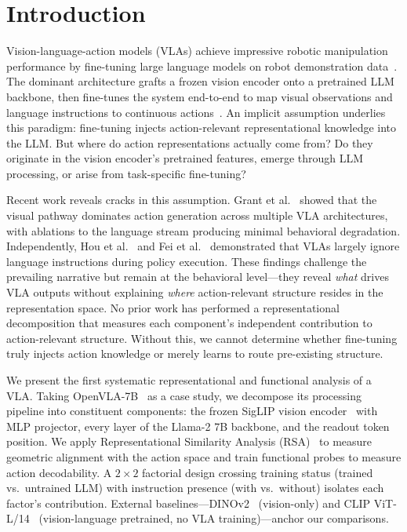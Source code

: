 \section{Introduction}
\label{sec:introduction}

Vision-language-action models (VLAs) achieve impressive robotic manipulation performance by fine-tuning large language models on robot demonstration data~\cite{brohan2023_rt2,kim2024_openvla}.
The dominant architecture grafts a frozen vision encoder onto a pretrained LLM backbone, then fine-tunes the system end-to-end to map visual observations and language instructions to continuous actions~\cite{karamcheti2024}.
An implicit assumption underlies this paradigm: fine-tuning injects action-relevant representational knowledge into the LLM.
But where do action representations actually come from?
Do they originate in the vision encoder's pretrained features, emerge through LLM processing, or arise from task-specific fine-tuning?

Recent work reveals cracks in this assumption.
Grant et al.~\cite{grant2026} showed that the visual pathway dominates action generation across multiple VLA architectures, with ablations to the language stream producing minimal behavioral degradation.
Independently, Hou et al.~\cite{hou2026} and Fei et al.~\cite{fei2025} demonstrated that VLAs largely ignore language instructions during policy execution.
These findings challenge the prevailing narrative but remain at the behavioral level---they reveal \emph{what} drives VLA outputs without explaining \emph{where} action-relevant structure resides in the representation space.
No prior work has performed a representational decomposition that measures each component's independent contribution to action-relevant structure.
Without this, we cannot determine whether fine-tuning truly injects action knowledge or merely learns to route pre-existing structure.

We present the first systematic representational and functional analysis of a VLA.
Taking OpenVLA-7B~\cite{kim2024_openvla} as a case study, we decompose its processing pipeline into constituent components: the frozen SigLIP vision encoder~\cite{zhai2023_siglip} with MLP projector, every layer of the Llama-2 7B backbone, and the readout token position.
We apply Representational Similarity Analysis (RSA)~\cite{kriegeskorte2008} to measure geometric alignment with the action space and train functional probes to measure action decodability.
A $2 \times 2$ factorial design crossing training status (trained vs.\ untrained LLM) with instruction presence (with vs.\ without) isolates each factor's contribution.
External baselines---DINOv2~\cite{oquab2024_dinov2} (vision-only) and CLIP ViT-L/14~\cite{radford2021_clip} (vision-language pretrained, no VLA training)---anchor our comparisons.

